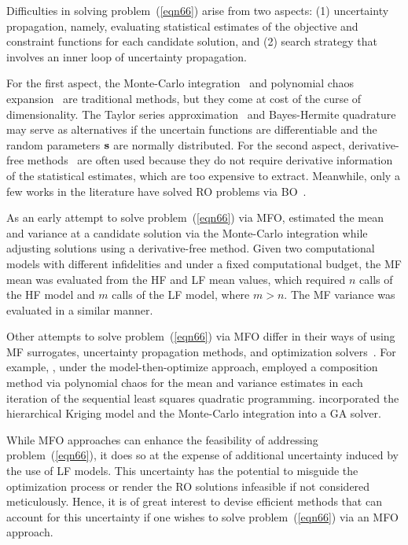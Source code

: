 \documentclass[journal ]{new-aiaa}
\begin{document}
	Difficulties in solving problem~(\ref{eqn66}) arise from two aspects: (1) uncertainty propagation, namely, evaluating statistical estimates of the objective and constraint functions for each candidate solution, and (2) search strategy that involves an inner loop of uncertainty propagation.
	
	For the first aspect, the Monte-Carlo integration~\citep{Caflisch1998} and polynomial chaos expansion~\citep{Crestaux2009} are traditional methods, but they come at cost of the curse of dimensionality.
	The Taylor series approximation~\citep{Anderson2012} and Bayes-Hermite quadrature~\citep{OHagan1991} may serve as alternatives if the uncertain functions are differentiable and the random parameters $\bf s$ are normally distributed.
	For the second aspect, derivative-free methods~\citep{Larson2019} are often used because they do not require derivative information of the statistical estimates, which are too expensive to extract.
	Meanwhile, only a few works in the literature have solved RO problems via BO~\citep{Do2021,Daulton2022RMOBO}. 
	
	As an early attempt to solve problem~(\ref{eqn66}) via MFO, \citet{Ng2014} estimated the mean and variance at a candidate solution via the Monte-Carlo integration while adjusting solutions using a derivative-free method.
	Given two computational models with different infidelities and under a fixed computational budget, the MF mean was evaluated from the HF and LF mean values, which required $n$ calls of the HF model and $m$ calls of the LF model, where $m>n$.
	The MF variance was evaluated in a similar manner.
	
	Other attempts to solve problem~(\ref{eqn66}) via MFO differ in their ways of using MF surrogates, uncertainty propagation methods, and optimization solvers~\citep[see e.g.,][]{Shah2015,Fusi2015,Chakraborty2017,Zhou2018}.
	For example, \citet{Shah2015}, under the model-then-optimize approach, employed a composition method via polynomial chaos for the mean and variance estimates in each iteration of the sequential least squares quadratic programming.
	\citet{Zhou2018} incorporated the hierarchical Kriging model and the Monte-Carlo integration into a GA solver.
	
	While MFO approaches can enhance the feasibility of addressing problem~(\ref{eqn66}), it does so at the expense of additional uncertainty induced by the use of LF models.
	This uncertainty has the potential to misguide the optimization process or render the RO solutions infeasible if not considered meticulously. 
	Hence, it is of great interest to devise efficient methods that can account for this uncertainty if one wishes to solve problem~(\ref{eqn66}) via an MFO approach.
	
\end{document}

